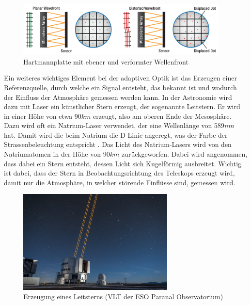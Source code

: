 \begin{refsection}
\begin{figure}
  \centering
  \includegraphics[width=0.95\textwidth]{adaptiv/images/hartmannplatte}
  \caption{Hartmannplatte mit ebener und verformter Wellenfront
    \cite{thor:hartmannplatte}}
  \label{fig:hartmannplatte}
\end{figure}

Ein weiteres wichtiges Element bei der adaptiven Optik ist das Erzeugen einer Referenzquelle, durch welche ein Signal entsteht, das bekannt ist und wodurch der Einfluss der Atmosphäre gemessen werden kann. In der Astronomie wird dazu mit Laser ein künstlicher Stern erzeugt, der sogenannte Leitstern. Er wird in einer Höhe von etwa 90$km$ erzeugt, also am oberen Ende der Mesosphäre. Dazu wird oft ein Natrium-Laser verwendet, der eine Wellenlänge von 589$nm$ hat. Damit wird die beim Natrium die D-Linie angeregt, was der Farbe der Strassenbeleuchtung entspricht . Das Licht des Natrium-Lasers wird von den Natriumatomen in der Höhe von 90$km$ zurückgeworfen. Dabei wird angenommen, dass dabei ein Stern entsteht, dessen Licht sich Kugelförmig ausbreitet. Wichtig ist dabei, dass der Stern in Beobachtungsrichtung des Teleskops erzeugt wird, damit nur die Atmosphäre, in welcher störende Einflüsse sind, gemessen wird. 


\begin{figure}
  \centering
  \includegraphics[width=0.7\textwidth]{adaptiv/images/Leitstern}
  \caption{Erzeugung eines Leitsterns (VLT der ESO Paranal Observatorium)
    \cite{eso:leitstern}}
  \label{fig:leitstern}
\end{figure}


\end{refsection}
